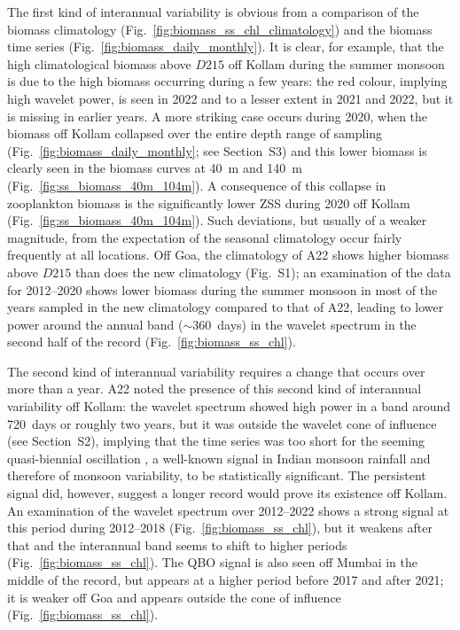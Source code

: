 \documentclass[authoryear,review,11pt]{elsarticle}
\begin{document}
The first kind of interannual variability is obvious from a comparison of the biomass climatology (Fig.~\ref{fig:biomass_ss_chl_climatology}) and the biomass time series (Fig.~\ref{fig:biomass_daily_monthly}).  It is clear, for example, that the high climatological biomass above $D215$ off Kollam during the summer monsoon is due to the high biomass occurring during a few years: the red colour, implying high wavelet power, is seen in 2022 and to a lesser extent in 2021 and 2022, but it is missing in earlier years.  A more striking case occurs during 2020, when the biomass off Kollam collapsed over the entire depth range of sampling (Fig.~\ref{fig:biomass_daily_monthly}; see Section~S3) and this lower biomass is clearly seen in the biomass curves at 40~m and 140~m (Fig.~\ref{fig:ss_biomass_40m_104m}). A consequence of this collapse in zooplankton biomass is the  significantly lower ZSS during 2020 off Kollam (Fig.~\ref{fig:ss_biomass_40m_104m}).  Such deviations, but usually of a weaker magnitude, from the expectation of the seasonal climatology occur fairly frequently at all locations.  Off Goa, the climatology of A22 shows higher biomass above $D215$ than does the new climatology (Fig.~S1); an examination of the data for 2012--2020 shows lower biomass during the summer monsoon in most of the years sampled in the new climatology compared to that of A22, leading to lower power around the annual band ($\sim$360~days) in the wavelet spectrum in the second half of the record (Fig.~\ref{fig:biomass_ss_chl}).

The second kind of interannual variability requires a change that occurs over more than a year. A22 noted the presence of this second kind of interannual variability off Kollam: the wavelet spectrum showed high power in a band around 720~days or roughly two years, but it was outside the wavelet cone of influence (see Section~S2), implying that the time series was too short for the seeming quasi-biennial oscillation \citep[QBO;][]{mooley1984fluctuations, bhalme1987tropical}, a well-known signal in Indian monsoon rainfall and therefore of monsoon variability, to be statistically significant.  The persistent signal did, however, suggest a longer record would prove its existence off Kollam.  An examination of the wavelet spectrum over 2012--2022 shows a strong signal at this period during 2012--2018 (Fig.~\ref{fig:biomass_ss_chl}), but it weakens after that and the interannual band seems to shift to higher periods (Fig.~\ref{fig:biomass_ss_chl}).  The QBO signal is also seen off Mumbai in the middle of the record, but appears at a higher period before 2017 and after 2021; it is weaker off Goa and appears outside the cone of influence (Fig.~\ref{fig:biomass_ss_chl}).
\end{document}

